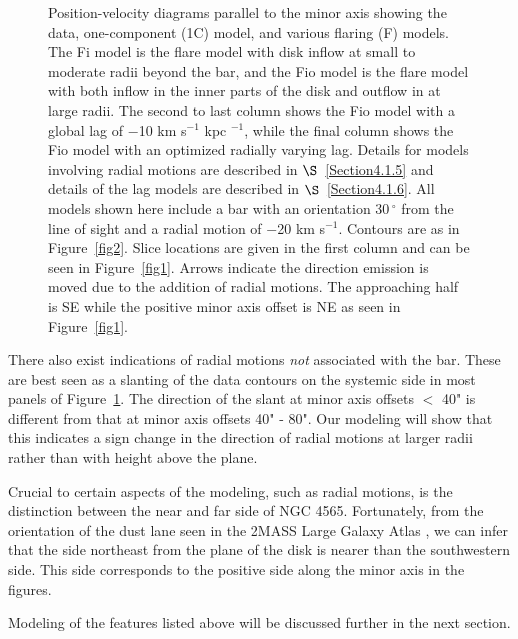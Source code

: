 \documentclass{emulateapj}
\begin{document}
\begin{figure}
\caption{Position-velocity diagrams parallel to the minor axis showing the data, one-component (1C) model, and various flaring (F) models. The Fi model is the flare model with disk inflow at small to moderate radii beyond the bar, and the Fio model is the flare model with both inflow in the inner parts of the disk and outflow in at large radii.  The second to last column shows the Fio model with a global lag of $-$10 km s$^{-1}$ kpc $^{-1}$, while the final column shows the Fio model with an optimized radially varying lag. Details for models involving radial motions are described in $\S$~\ref{Section4.1.5} and details of the lag models are described in $\S$~\ref{Section4.1.6}.  All models shown here include a bar with an orientation 30$\,^{\circ}$ from the line of sight and a radial motion of $-$20 km s$^{-1}$.  Contours are as in Figure~\ref{fig2}.  Slice locations are given in the first column and can be seen in Figure~\ref{fig1}. Arrows indicate the direction emission is moved due to the addition of radial motions.  The approaching half is SE while the positive minor axis offset is NE as seen in Figure~\ref{fig1}.\label{fig3}}
\end{figure}

\par
    There also exist indications of radial motions \textit{not} associated with the bar.  These are best seen as a slanting of the data contours on the systemic side in most panels of Figure~\ref{fig3}.  The direction of the slant at minor axis offsets $<$ 40" is different from that at minor axis offsets 40" - 80".  Our modeling will show that this indicates a sign change in the direction of radial motions at larger radii rather than with height above the plane.

\par
      Crucial to certain aspects of the modeling, such as radial motions, is the distinction between the near and far side of NGC 4565.  Fortunately, from the orientation of the dust lane seen in the 2MASS Large Galaxy Atlas \citep{2003AJ....125..525J}, we can infer that the side northeast from the plane of the disk is nearer than the southwestern side.  This side corresponds to the positive side along the minor axis in the figures.

\par
     Modeling of the features listed above will be discussed further in the next section.
\end{document}
